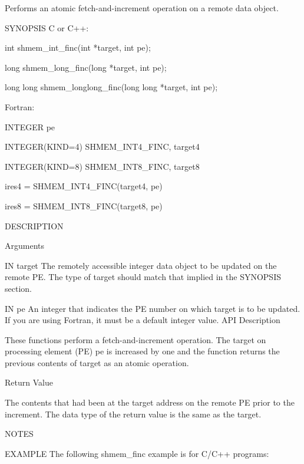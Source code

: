        Performs an atomic fetch-and-increment  operation
       on a remote data object.

SYNOPSIS
       C or C++:

	  int shmem_int_finc(int *target, int pe);

	  long shmem_long_finc(long *target, int pe);

	  long long shmem_longlong_finc(long long *target, int pe);

       Fortran:

	  INTEGER pe

	  INTEGER(KIND=4) SHMEM_INT4_FINC, target4

	  INTEGER(KIND=8) SHMEM_INT8_FINC, target8

	  ires4 = SHMEM_INT4_FINC(target4, pe)

	  ires8 = SHMEM_INT8_FINC(target8, pe)

DESCRIPTION

Arguments

	IN       target	 The  remotely accessible integer data object to be updated on
		 the remote PE.	 The type of target should match that  implied
		 in the SYNOPSIS section.

       IN	pe	 An integer that indicates the PE number on which target is to
		 be updated. If you are using Fortran, it must	be  a  default
		 integer value.
API Description

       These functions perform a fetch-and-increment operation.	 The target on
       processing element (PE) pe is increased by one and the function returns
       the previous contents of target as an atomic operation.

Return Value

       The contents that had been at the target address on the remote PE prior
       to the increment. The data type of the return value is the same as the target.

NOTES

EXAMPLE
	The following shmem_finc example is for C/C++ programs:

       
	
